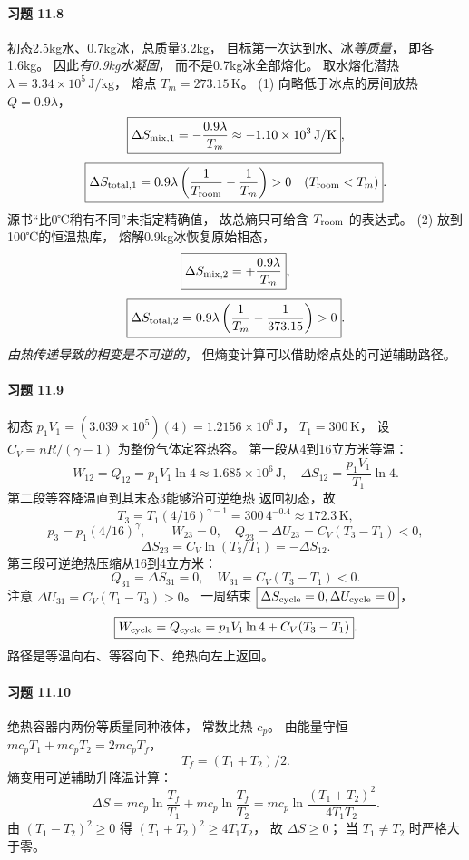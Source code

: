 \paragraph{习题 11.8}
初态2.5kg水、0.7kg冰，总质量3.2kg，
目标第一次达到水、冰\emph{等质量}，
即各1.6kg。
因此\emph{有0.9kg水凝固}，
而不是0.7kg冰全部熔化。
取水熔化潜热
\(\lambda=3.34\times10^5\,\mathrm{J/kg}\)，
熔点 \(T_m=273.15\,\mathrm K\)。
(1) 向略低于冰点的房间放热
\(Q=0.9\lambda\)，
\[
 \boxed{\Delta S_{\rm mix,1}
 =-\frac{0.9\lambda}{T_m}
 \approx-1.10\times10^3\,\mathrm{J/K}},
\]
\[
 \boxed{\Delta S_{\rm total,1}
 =0.9\lambda\left(\frac1{T_{\rm room}}
 -\frac1{T_m}\right)>0
 \quad(T_{\rm room}<T_m)}.
\]
源书“比0℃稍有不同”未指定精确值，
故总熵只可给含 \(T_{\rm room}\) 的表达式。
(2) 放到100℃的恒温热库，
熔解0.9kg冰恢复原始相态，
\[
 \boxed{\Delta S_{\rm mix,2}
 =+\frac{0.9\lambda}{T_m}},
\]
\[
 \boxed{\Delta S_{\rm total,2}
 =0.9\lambda\left(\frac1{T_m}
 -\frac1{373.15}\right)>0}.
\]
\emph{由热传递导致的相变是不可逆的}，
但熵变计算可以借助熔点处的可逆辅助路径。

\paragraph{习题 11.9}
初态 \(p_1V_1=(3.039\times10^5)(4)
 =1.2156\times10^6\,\mathrm J\)，
\(T_1=300\,\mathrm K\)，
设 \(C_V=nR/(\gamma-1)\) 为整份气体定容热容。
第一段从4到16立方米等温：
\[
 \boxed{W_{12}=Q_{12}
 =p_1V_1\ln4\approx1.685\times10^6\,\mathrm J},
\quad
 \boxed{\Delta S_{12}=\frac{p_1V_1}{T_1}\ln4}.
\]
第二段等容降温直到其末态3能够沿可逆绝热
返回初态，故
\[
 T_3=T_1(4/16)^{\gamma-1}
 =300\,4^{-0.4}\approx172.3\,\mathrm K,
\]
\[
 p_3=p_1(4/16)^\gamma,\qquad
 W_{23}=0,\quad Q_{23}=\Delta U_{23}
 =C_V(T_3-T_1)<0,
\]
\[
 \boxed{\Delta S_{23}
 =C_V\ln(T_3/T_1)=-\Delta S_{12}}.
\]
第三段可逆绝热压缩从16到4立方米：
\[
 Q_{31}=\Delta S_{31}=0,\quad
 \boxed{W_{31}=C_V(T_3-T_1)<0}.
\]
注意 \(\Delta U_{31}=C_V(T_1-T_3)>0\)。
一周结束 \(\boxed{\Delta S_{\rm cycle}=0,
 \Delta U_{\rm cycle}=0}\)，
\[
 \boxed{W_{\rm cycle}=Q_{\rm cycle}
 =p_1V_1\ln4+C_V(T_3-T_1)}.
\]
路径是等温向右、等容向下、绝热向左上返回。

\paragraph{习题 11.10}
绝热容器内两份等质量同种液体，
常数比热 \(c_p\)。
由能量守恒
\(mc_pT_1+mc_pT_2=2mc_pT_f\)，
\[
 \boxed{T_f=(T_1+T_2)/2}.
\]
熵变用可逆辅助升降温计算：
\[
 \boxed{\Delta S=mc_p\ln\frac{T_f}{T_1}
 +mc_p\ln\frac{T_f}{T_2}
 =mc_p\ln\frac{(T_1+T_2)^2}{4T_1T_2}}.
\]
由 \((T_1-T_2)^2\ge0\) 得
\((T_1+T_2)^2\ge4T_1T_2\)，
故 \(\Delta S\ge0\)；
当 \(T_1\ne T_2\) 时严格大于零。

